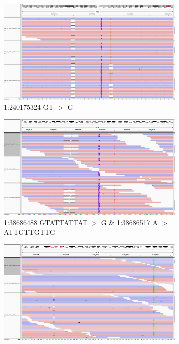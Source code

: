 \documentclass{article}
\begin{document}
\begin{landscape}

\begin{figure}[ht!]
    \centering
    \begin{subfigure}[b]{0.33\textwidth}
        \includegraphics[width=\textwidth]{figures/1_240175324_GTdel}
        \caption{\tiny 1:240175324 GT $>$ G}
    \end{subfigure}
    \begin{subfigure}[b]{0.33\textwidth}
        \includegraphics[width=\textwidth]{figures/2_38686488_GTATTATTATdel_38686517_ATTGTTGTTGins}
        \caption{\tiny 1:38686488 GTATTATTAT $>$ G \& 1:38686517 A $>$ ATTGTTGTTG}
    \end{subfigure}
    \begin{subfigure}[b]{0.33\textwidth}
        \includegraphics[width=\textwidth]{figures/4_35702731_GAdel}

\end{subfigure}
\end{figure}
\end{landscape}
\end{document}
